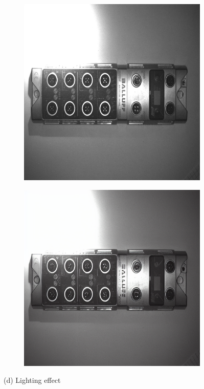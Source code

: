 \documentclass[12pt,DIV14,BCOR12mm,a4paper,footinclude=false,headinclude,parskip=half-,twoside,openright,cleardoublepage=empty,toc=index,bibliography=totoc,listof=totoc]{scrreprt}
\numberwithin{equation}{chapter}
\begin{document}
\begin{figure}
    \vspace{0.3cm} %

    \begin{subfigure}[t]{0.24\textwidth}
        \centering
        \includegraphics[width=\textwidth]{../media/diff_bni_light_real.png}
    \end{subfigure}%
    \hspace{0.02\textwidth}
    \begin{subfigure}[t]{0.24\textwidth}
        \centering
        \includegraphics[width=\textwidth]{../media/diff_bni_light_fake.png}
    \end{subfigure}
    \caption*{(d) Lighting effect}


\end{figure}
\end{document}

